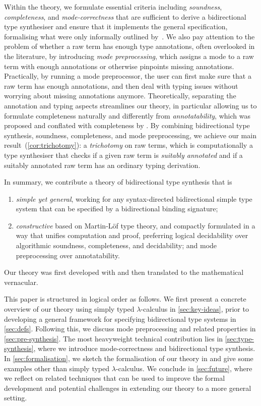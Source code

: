 Within the theory, we formulate essential criteria including \emph{soundness}, \emph{completeness}, and \emph{mode-correctness} that are sufficient to derive a bidirectional type synthesiser and ensure that it implements the general specification, formalising what were only informally outlined by~\citet{Dunfield2021}.
We also pay attention to the problem of whether a raw term has enough type annotations, often overlooked in the literature, by introducing \emph{mode preprocessing}, which assigns a mode to a raw term with enough annotations or otherwise pinpoints missing annotations.
Practically, by running a mode preprocessor, the user can first make sure that a raw term has enough annotations, and then deal with typing issues without worrying about missing annotations anymore.
Theoretically, separating the annotation and typing aspects streamlines our theory, in particular allowing us to formulate completeness naturally and differently from \emph{annotatability}, which was proposed and conflated with completeness by \citet{Dunfield2021}.
By combining bidirectional type synthesis, soundness, completeness, and mode preprocessing, we achieve our main result~(\cref{cor:trichotomy}): a \emph{trichotomy} on raw terms, which is computationally a type synthesiser that checks if a given raw term is \emph{suitably annotated} and if a suitably annotated raw term has an ordinary typing derivation.

In summary, we contribute a theory of bidirectional type synthesis that is
\begin{enumerate}
  \item \emph{simple yet general}, working for any syntax-directed bidirectional simple type system that can be specified by a bidirectional binding signature;
  \item \emph{constructive} based on Martin-L\"of type theory, and compactly formulated in a way that unifies computation and proof, preferring logical decidability over algorithmic soundness, completeness, and decidability; and mode preprocessing over annotatability.
\end{enumerate}
Our theory was first developed with \Agda and then translated to the mathematical vernacular.

This paper is structured in logical order as follows.
We first present a concrete overview of our theory using simply typed $\lambda$-calculus in \cref{sec:key-ideas}, prior to developing a general framework for specifying bidirectional type systems in \cref{sec:defs}.
Following this, we discuss mode preprocessing and related properties in \cref{sec:pre-synthesis}.
The most heavyweight technical contribution lies in \cref{sec:type-synthesis}, where we introduce mode-correctness and bidirectional type synthesis.
In \cref{sec:formalisation}, we sketch the formalisation of our theory in \Agda and give some examples other than simply typed $\lambda$-calculus.
We conclude in \cref{sec:future}, where we reflect on related techniques that can be used to improve the formal development and potential challenges in extending our theory to a more general setting.

